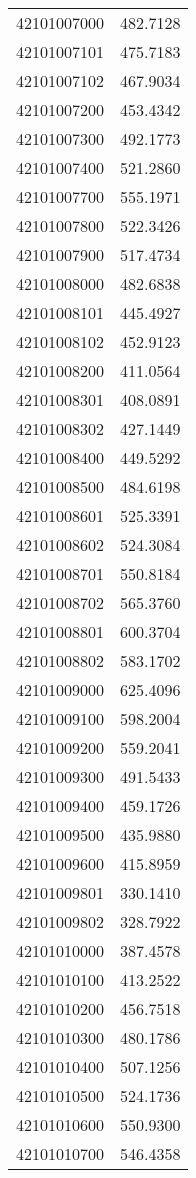 \begin{longtable}[t]{lr}
42101007000 & 482.7128\\
42101007101 & 475.7183\\
42101007102 & 467.9034\\
42101007200 & 453.4342\\
42101007300 & 492.1773\\
42101007400 & 521.2860\\
42101007700 & 555.1971\\
42101007800 & 522.3426\\
42101007900 & 517.4734\\
42101008000 & 482.6838\\
42101008101 & 445.4927\\
42101008102 & 452.9123\\
42101008200 & 411.0564\\
42101008301 & 408.0891\\
42101008302 & 427.1449\\
42101008400 & 449.5292\\
42101008500 & 484.6198\\
42101008601 & 525.3391\\
42101008602 & 524.3084\\
42101008701 & 550.8184\\
42101008702 & 565.3760\\
42101008801 & 600.3704\\
42101008802 & 583.1702\\
42101009000 & 625.4096\\
42101009100 & 598.2004\\
42101009200 & 559.2041\\
42101009300 & 491.5433\\
42101009400 & 459.1726\\
42101009500 & 435.9880\\
42101009600 & 415.8959\\
42101009801 & 330.1410\\
42101009802 & 328.7922\\
42101010000 & 387.4578\\
42101010100 & 413.2522\\
42101010200 & 456.7518\\
42101010300 & 480.1786\\
42101010400 & 507.1256\\
42101010500 & 524.1736\\
42101010600 & 550.9300\\
42101010700 & 546.4358\\

\end{longtable}
